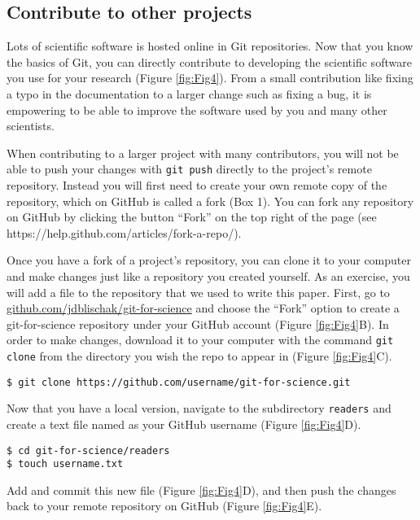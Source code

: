 \subsection{Contribute to other projects}

Lots of scientific software is hosted online in Git repositories.
Now that you know the basics of Git, you can directly contribute to developing the scientific software you use for your research (Figure \ref{fig:Fig4}).
From a small contribution like fixing a typo in the documentation to a larger change such as fixing a bug, it is empowering to be able to improve the software used by you and many other scientists.

When contributing to a larger project with many contributors, you will not be able to push your changes with \verb|git push| directly to the project's remote repository.
Instead you will first need to create your own remote copy of the repository, which on GitHub is called a fork (Box 1).
You can fork any repository on GitHub by clicking the button ``Fork'' on the top right of the page (see https://help.github.com/articles/fork-a-repo/).

Once you have a fork of a project's repository, you can clone it to your computer and make changes just like a repository you created yourself.
As an exercise, you will add a file to the repository that we used to write this paper.
First, go to \href{https://github.com/jdblischak/git-for-science}{github.com/jdblischak/git-for-science} and choose the ``Fork'' option to create a git-for-science repository under your GitHub account (Figure \ref{fig:Fig4}B).
In order to make changes, download it to your computer with the command \verb|git clone| from the directory you wish the repo to appear in (Figure \ref{fig:Fig4}C).

\begin{verbatim}
$ git clone https://github.com/username/git-for-science.git
\end{verbatim}

Now that you have a local version, navigate to the subdirectory \verb|readers| and create a text file named as your GitHub username (Figure \ref{fig:Fig4}D).

\begin{verbatim}
$ cd git-for-science/readers
$ touch username.txt
\end{verbatim}

Add and commit this new file (Figure \ref{fig:Fig4}D), and then push the changes back to your remote repository on GitHub (Figure \ref{fig:Fig4}E).

